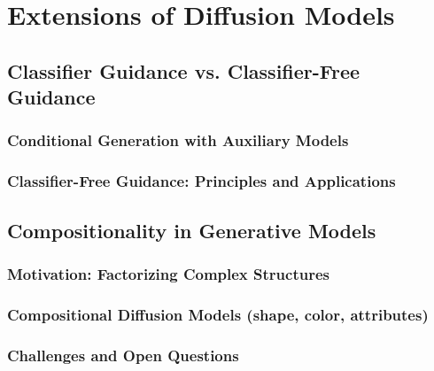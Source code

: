 \section{Extensions of Diffusion Models}
\label{sec:extensions}

\subsection{Classifier Guidance vs. Classifier-Free Guidance}
\label{subsec:guidance}
\subsubsection{Conditional Generation with Auxiliary Models}
\label{subsubsec:aux-guidance}
\subsubsection{Classifier-Free Guidance: Principles and Applications}
\label{subsubsec:cfg}

\subsection{Compositionality in Generative Models}
\label{subsec:compositionality}
\subsubsection{Motivation: Factorizing Complex Structures}
\label{subsubsec:motivation-composition}
\subsubsection{Compositional Diffusion Models (shape, color, attributes)}
\label{subsubsec:compositional-diffusion}
\subsubsection{Challenges and Open Questions}
\label{subsubsec:composition-challenges}
